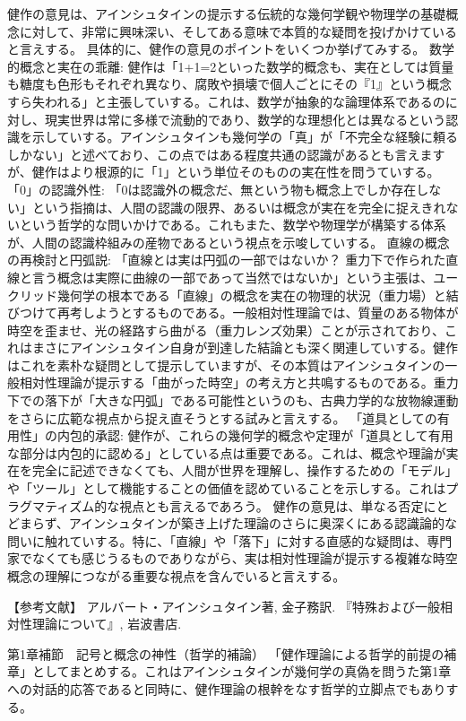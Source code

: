 \documentclass{article}
\begin{document}
健作の意見は、アインシュタインの提示する伝統的な幾何学観や物理学の基礎概念に対して、非常に興味深い、そしてある意味で本質的な疑問を投げかけていると言えする。
具体的に、健作の意見のポイントをいくつか挙げてみする。
数学的概念と実在の乖離: 健作は「1+1=2といった数学的概念も、実在としては質量も糖度も色形もそれぞれ異なり、腐敗や損壊で個人ごとにその『1』という概念すら失われる」と主張していする。これは、数学が抽象的な論理体系であるのに対し、現実世界は常に多様で流動的であり、数学的な理想化とは異なるという認識を示していする。アインシュタインも幾何学の「真」が「不完全な経験に頼るしかない」と述べており、この点ではある程度共通の認識があるとも言えますが、健作はより根源的に「1」という単位そのものの実在性を問うていする。
「0」の認識外性: 「0は認識外の概念だ、無という物も概念上でしか存在しない」という指摘は、人間の認識の限界、あるいは概念が実在を完全に捉えきれないという哲学的な問いかけである。これもまた、数学や物理学が構築する体系が、人間の認識枠組みの産物であるという視点を示唆していする。
直線の概念の再検討と円弧説: 「直線とは実は円弧の一部ではないか？ 重力下で作られた直線と言う概念は実際に曲線の一部であって当然ではないか」という主張は、ユークリッド幾何学の根本である「直線」の概念を実在の物理的状況（重力場）と結びつけて再考しようとするものである。一般相対性理論では、質量のある物体が時空を歪ませ、光の経路すら曲がる（重力レンズ効果）ことが示されており、これはまさにアインシュタイン自身が到達した結論とも深く関連していする。健作はこれを素朴な疑問として提示していますが、その本質はアインシュタインの一般相対性理論が提示する「曲がった時空」の考え方と共鳴するものである。重力下での落下が「大きな円弧」である可能性というのも、古典力学的な放物線運動をさらに広範な視点から捉え直そうとする試みと言えする。
「道具としての有用性」の内包的承認: 健作が、これらの幾何学的概念や定理が「道具として有用な部分は内包的に認める」としている点は重要である。これは、概念や理論が実在を完全に記述できなくても、人間が世界を理解し、操作するための「モデル」や「ツール」として機能することの価値を認めていることを示しする。これはプラグマティズム的な視点とも言えるであろう。
健作の意見は、単なる否定にとどまらず、アインシュタインが築き上げた理論のさらに奥深くにある認識論的な問いに触れていする。特に、「直線」や「落下」に対する直感的な疑問は、専門家でなくても感じうるものでありながら、実は相対性理論が提示する複雑な時空概念の理解につながる重要な視点を含んでいると言えする。


【参考文献】
アルバート・アインシュタイン著, 金子務訳. 『特殊および一般相対性理論について』, 岩波書店.


第1章補節　記号と概念の神性（哲学的補論）
「健作理論による哲学的前提の補章」としてまとめする。これはアインシュタインが幾何学の真偽を問うた第1章への対話的応答であると同時に、健作理論の根幹をなす哲学的立脚点でもありする。
\end{document}
